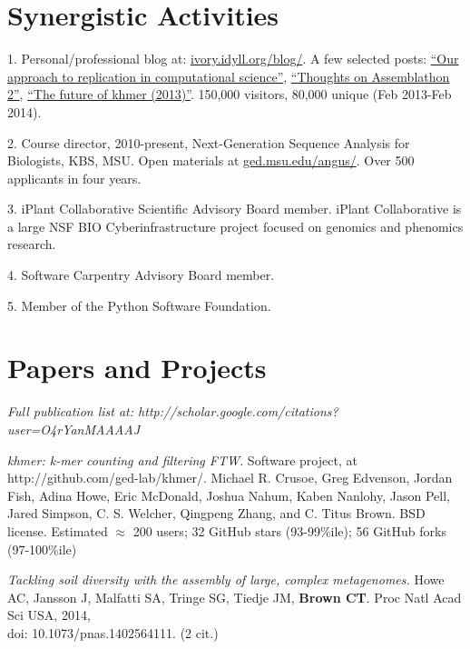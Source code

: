 \documentclass[margin,line]{resume}
\begin{document}
\begin{resume}
    \section{\mysidestyle Synergistic Activities}

\begin{list1}
\item[] 1. Personal/professional blog at: \href{http://ivory.idyll.org/blog/}{ivory.idyll.org/blog/}.  A few selected posts: \href{http://ivory.idyll.org/blog/replication-i.html}{``Our approach to replication in computational science''}, \href{http://ivory.idyll.org/blog/thoughts-on-assemblathon-2.html}{``Thoughts on Assemblathon 2''}, \href{http://ivory.idyll.org/blog/the-future-of-khmer-2013-version.html}{``The future of khmer (2013)''}.  150,000 visitors, 80,000 unique (Feb 2013-Feb 2014).
\item[] 2. Course director, 2010-present, Next-Generation Sequence Analysis for Biologists, KBS, MSU.  Open materials at \href{http://ged.msu.edu/angus/}{ged.msu.edu/angus/}. Over 500 applicants in four years.
\item[] 3. iPlant Collaborative Scientific Advisory Board member.  iPlant Collaborative is a large NSF BIO Cyberinfrastructure project focused on genomics and phenomics research.
\item[] 4. Software Carpentry Advisory Board member.
\item[] 5. Member of the Python Software Foundation.

\end{list1}

    \section{\mysidestyle Papers and Projects}

{\em Full publication list at: http://scholar.google.com/citations?user=O4rYanMAAAAJ}

{\em khmer: k-mer counting and filtering FTW.} Software project, at http://github.com/ged-lab/khmer/. Michael R. Crusoe, Greg Edvenson, Jordan Fish, Adina Howe, Eric McDonald, Joshua Nahum, Kaben Nanlohy, Jason Pell, Jared Simpson, C. S. Welcher, Qingpeng Zhang, and C. Titus Brown.  BSD license. Estimated $\approx$ 200 users; 32 GitHub stars (93-99\%ile); 56 GitHub forks (97-100\%ile)

{\em Tackling soil diversity with the assembly of large, complex metagenomes.} Howe AC, Jansson J, Malfatti SA, Tringe SG, Tiedje JM, {\bf Brown CT}. Proc Natl Acad Sci USA, 2014, \\
doi: 10.1073/pnas.1402564111. (2 cit.)


\end{resume}
\end{document}
